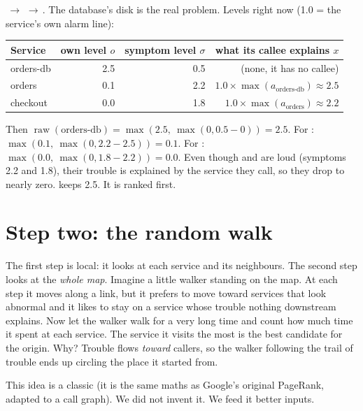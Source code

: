 \begin{examplebox}
\,$\to$\,\,$\to$\,. The database's disk is the real problem. Levels right now (1.0 = the service's own alarm line):

\medskip
\begin{center}
\small
\begin{tabular}{lrrr}
\toprule
Service & own level $o$ & symptom level $\sigma$ & what its callee explains $x$\\
\midrule
orders-db & 2.5 & 0.5 & (none, it has no callee) \\
orders & 0.1 & 2.2 & $1.0\times\max(a_{\text{orders-db}})\approx 2.5$\\
checkout & 0.0 & 1.8 & $1.0\times\max(a_{\text{orders}})\approx 2.2$\\
\bottomrule
\end{tabular}
\end{center}

Then $\operatorname{raw}(\text{orders-db})=\max(2.5,\ \max(0,0.5-0))=2.5$. For : $\max(0.1,\ \max(0,2.2-2.5))=0.1$. For : $\max(0.0,\ \max(0,1.8-2.2))=0.0$. Even though  and  are loud (symptoms 2.2 and 1.8), their trouble is explained by the service they call, so they drop to nearly zero.  keeps 2.5. It is ranked first.
\end{examplebox}

\section{Step two: the random walk}
\begin{simplebox}
The first step is local: it looks at each service and its neighbours. The second step looks at the \emph{whole map}. Imagine a little walker standing on the map. At each step it moves along a link, but it prefers to move toward services that look abnormal and it likes to stay on a service whose trouble nothing downstream explains. Now let the walker walk for a very long time and count how much time it spent at each service. The service it visits the most is the best candidate for the origin. Why? Trouble flows \emph{toward} callers, so the walker following the trail of trouble ends up circling the place it started from.

This idea is a classic (it is the same maths as Google's original PageRank, adapted to a call graph). We did not invent it. We feed it better inputs.
\end{simplebox}

